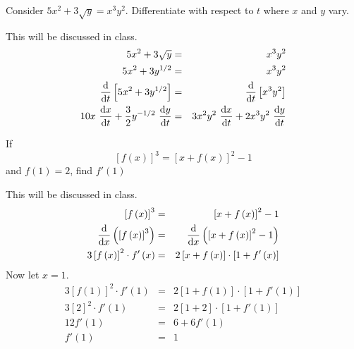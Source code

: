 \documentclass[12pt,addpoints, answers, fleqn]{exam}
\begin{document}
\begin{questions}
\question Consider $5x^2 + 3\sqrt{y}=x^3y^2$. Differentiate with respect to $t$ where $x$ and $y$ vary.
\begin{solution}
This will be discussed in class.
\begin{eqnarray*}
5x^2 + 3\sqrt{y} &=& x^3y^2\\
5x^2 + 3 y^{1/2} &=& x^3y^2\\
\frac{{\rm{d}}}{{\rm{d}}t} \left[ 5x^2 + 3 y^{1/2}  \right] &=& \frac{{\rm{d}}}{{\rm{d}}t} \left[   x^3y^2 \right]\\
10 x \ \frac{{\rm{d}}x}{{\rm{d}}t} + \frac{3}{2} y^{-1/2} \ \frac{{\rm{d}}y}{{\rm{d}}t} &=& 3x^2y^2 \ \frac{{\rm{d}}x}{{\rm{d}}t} + 2x^3y^2 \ \frac{{\rm{d}}y}{{\rm{d}}t}
\end{eqnarray*}
\end{solution}

\question If
\[
\left[ f \left( x \right) \right]^3 = \left[ x + f \left( x \right) \right]^2 - 1
\]
and $f \left( 1 \right) = 2$, find $f' \left( 1 \right)$
\begin{solution}
This will be discussed in class.
\begin{eqnarray*}
\left[ f \left( x \right) \right]^3 &=& \left[ x + f \left( x \right) \right]^2 - 1\\
\frac{{\rm{d}}}{{\rm{d}}x} \left(  \left[ f \left( x \right) \right]^3 \right) &=& \frac{{\rm{d}}}{{\rm{d}}x} \left(  \left[ x + f \left( x \right) \right]^2 - 1 \right)\\
3 \left[ f \left( x \right) \right]^2 \cdot f'\left( x\right) &=&  2 \left[ x + f \left( x \right) \right] \cdot \left[ 1 + f' \left( x \right) \right]
\end{eqnarray*}
Now let $x=1$.
\begin{eqnarray*}
3 \left[ f \left( 1 \right) \right]^2 \cdot f'\left( 1 \right) &=&  2 \left[ 1 + f \left( 1 \right) \right] \cdot \left[ 1 + f' \left( 1 \right) \right]\\
3 \left[ 2  \right]^2 \cdot f'\left( 1 \right) &=&  2 \left[ 1 + 2  \right] \cdot \left[ 1 + f' \left( 1 \right) \right]\\
12 f' \left( 1 \right) &=& 6 + 6 f'\left( 1 \right)\\
f' \left( 1 \right) &=& 1
\end{eqnarray*}
\end{solution}



\end{questions}
\end{document}

